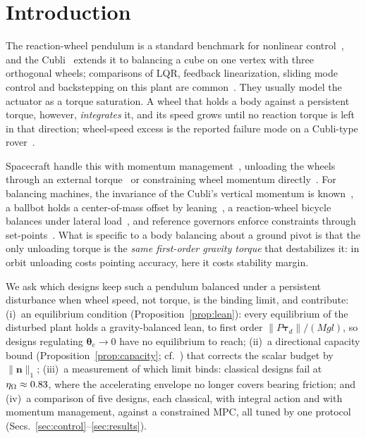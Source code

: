 \documentclass[conference]{IEEEtran}
\theoremstyle{definition}
\theoremstyle{plain}
\newcommand{\btau}{\boldsymbol{\tau}}
\newcommand{\bn}{\boldsymbol{n}}
\newcommand{\btheta}{\boldsymbol{\theta}}
\begin{document}
\section{Introduction}
\label{sec:intro}

The reaction-wheel pendulum is a standard benchmark for nonlinear
control~\cite{spong2001}, and the Cubli~\cite{gajamohan2013,muehlebach2017}
extends it to balancing a cube on one vertex with three orthogonal wheels;
comparisons of LQR, feedback linearization, sliding mode control and
backstepping on this plant are common~\cite{wasiwitono2025}. They usually model
the actuator as a torque saturation. A wheel that holds a body against a
persistent torque, however, \emph{integrates} it, and its speed grows until no
reaction torque is left in that direction; wheel-speed excess is the reported
failure mode on a Cubli-type rover~\cite{huang2022}.

Spacecraft handle this with momentum management~\cite{sidi1997}, unloading the
wheels through an external torque~\cite{powell1972} or constraining wheel
momentum directly~\cite{alipour2025}. For balancing machines, the invariance of
the Cubli's vertical momentum is known~\cite{muehlebach2017}, a ballbot holds a
center-of-mass offset by leaning~\cite{vaidya2015ballbot}, a reaction-wheel
bicycle balances under lateral load~\cite{huang2025bicycle}, and reference
governors enforce constraints through set-points~\cite{garone2017governors}.
What is specific to a body balancing about a ground pivot is that the only
unloading torque is the \emph{same first-order gravity torque} that
destabilizes it: in orbit unloading costs pointing accuracy, here it costs
stability margin.

We ask which designs keep such a pendulum balanced under a persistent
disturbance when wheel speed, not torque, is the binding limit, and contribute:
(i)~an equilibrium condition (Proposition~\ref{prop:lean}): every equilibrium of
the disturbed plant holds a gravity-balanced lean, to first order
$\|P\btau_d\|/(Mgl)$, so designs regulating $\btheta_e\!\to\!0$ have no
equilibrium to reach; (ii)~a directional capacity bound
(Proposition~\ref{prop:capacity}; cf.~\cite{markley2009envelopes}) that corrects
the scalar budget by $\|\bn\|_1$; (iii)~a measurement of which limit binds:
classical designs fail at $\eta_\Omega\approx0.83$, where the accelerating
envelope no longer covers bearing friction; and (iv)~a comparison of five
designs, each classical, with integral action and with momentum management,
against a constrained MPC, all tuned by one protocol
(Secs.~\ref{sec:control}--\ref{sec:results}).
\end{document}
